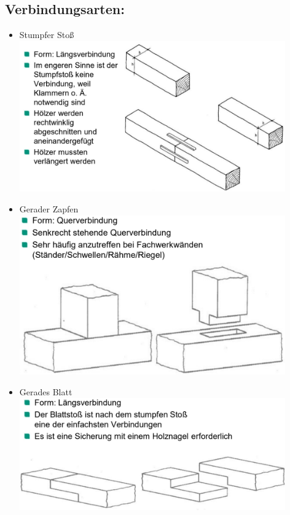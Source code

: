 \documentclass[fleqn,twoside]{article}
\begin{document}
    \subsection{Verbindungsarten:}
    \begin{minipage}{0.45\textwidth}
        \begin{itemize}
                    \item Stumpfer Stoß\\
                        \includegraphics[width=0.9\textwidth]{Grafiken/Zimmermansmaessige Verbindungen/Verbindungsarten/Stumpfer Stoss.jpg}\\
                    \item Gerader Zapfen\\
                        \includegraphics[width=0.9\textwidth]{Grafiken/Zimmermansmaessige Verbindungen/Verbindungsarten/Gerader Zapfen.jpg}\\
                    \item Gerades Blatt\\
                        \includegraphics[width=0.9\textwidth]{Grafiken/Zimmermansmaessige Verbindungen/Verbindungsarten/Gerades Blatt.jpg}\\

\end{itemize}
\end{minipage}
\end{document}
